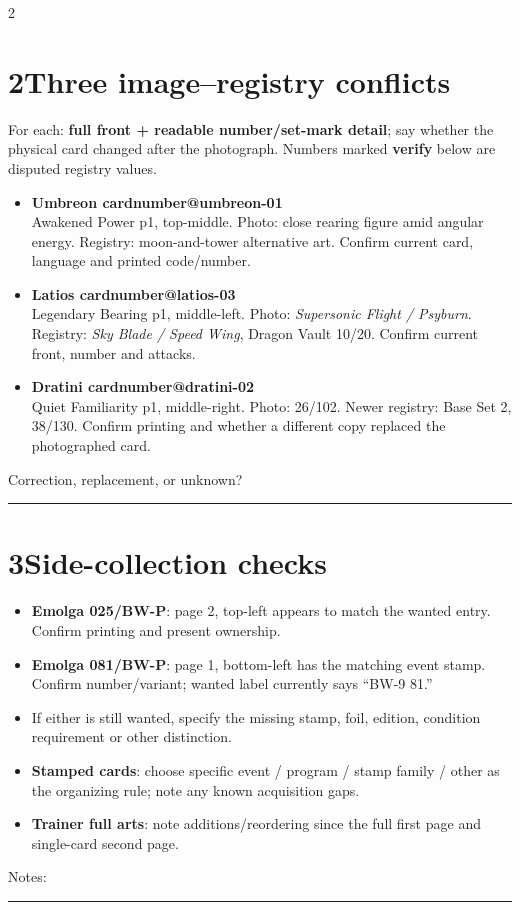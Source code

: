 \documentclass[10pt,a4paper]{article}
\makeatletter
\newcommand{\id}[1]{\csname cardnumber@#1\endcsname}
\newcommand{\blank}{\rule{\linewidth}{0.25pt}}
\makeatother
\begin{document}
\begin{multicols}{2}
\section{2\quad Three image--registry conflicts}
For each: \textbf{full front + readable number/set-mark detail}; say whether the physical card changed after the photograph. Numbers marked \textbf{verify} below are disputed registry values.
\begin{itemize}
\item \textbf{Umbreon \id{umbreon-01}}\\
Awakened Power p1, top-middle. Photo: close rearing figure amid angular energy. Registry: moon-and-tower alternative art. Confirm current card, language and printed code/number.
\item \textbf{Latios \id{latios-03}}\\
Legendary Bearing p1, middle-left. Photo: \emph{Supersonic Flight / Psyburn}. Registry: \emph{Sky Blade / Speed Wing}, Dragon Vault 10/20. Confirm current front, number and attacks.
\item \textbf{Dratini \id{dratini-02}}\\
Quiet Familiarity p1, middle-right. Photo: 26/102. Newer registry: Base Set 2, 38/130. Confirm printing and whether a different copy replaced the photographed card.
\end{itemize}
Correction, replacement, or unknown?\par\blank

\section{3\quad Side-collection checks}
\begin{itemize}
\item \textbf{Emolga 025/BW-P}: page 2, top-left appears to match the wanted entry. Confirm printing and present ownership.
\item \textbf{Emolga 081/BW-P}: page 1, bottom-left has the matching event stamp. Confirm number/variant; wanted label currently says ``BW-9 81.''
\item If either is still wanted, specify the missing stamp, foil, edition, condition requirement or other distinction.
\item \textbf{Stamped cards}: choose specific event / program / stamp family / other as the organizing rule; note any known acquisition gaps.
\item \textbf{Trainer full arts}: note additions/reordering since the full first page and single-card second page.
\end{itemize}
Notes: \hrulefill\par\blank


\end{multicols}
\end{document}
